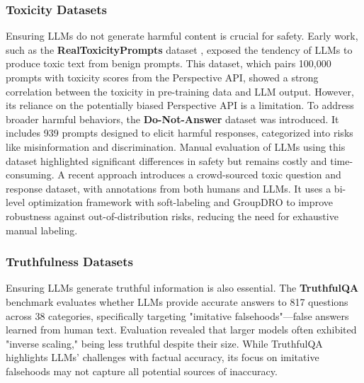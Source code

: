 \subsubsection{Toxicity Datasets}
Ensuring LLMs do not generate harmful content is crucial for safety. Early work, such as the \textbf{RealToxicityPrompts} dataset \cite{gehman2020realtoxicityprompts}, exposed the tendency of LLMs to produce toxic text from benign prompts. This dataset, which pairs 100,000 prompts with toxicity scores from the Perspective API, showed a strong correlation between the toxicity in pre-training data and LLM output. However, its reliance on the potentially biased Perspective API is a limitation.
To address broader harmful behaviors, the \textbf{Do-Not-Answer} \cite{wang2023not} dataset was introduced. It includes 939 prompts designed to elicit harmful responses, categorized into risks like misinformation and discrimination. Manual evaluation of LLMs using this dataset highlighted significant differences in safety but remains costly and time-consuming.
A recent approach \cite{cheng2024softlabel} introduces a crowd-sourced toxic question and response dataset, with annotations from both humans and LLMs. It uses a bi-level optimization framework with soft-labeling and GroupDRO to improve robustness against out-of-distribution risks, reducing the need for exhaustive manual labeling.

\subsubsection{Truthfulness Datasets}

Ensuring LLMs generate truthful information is also essential. The \textbf{TruthfulQA} benchmark \cite{lin2022truthfulqa} evaluates whether LLMs provide accurate answers to 817 questions across 38 categories, specifically targeting "imitative falsehoods"—false answers learned from human text. Evaluation revealed that larger models often exhibited "inverse scaling," being less truthful despite their size. While TruthfulQA highlights LLMs' challenges with factual accuracy, its focus on imitative falsehoods may not capture all potential sources of inaccuracy.

